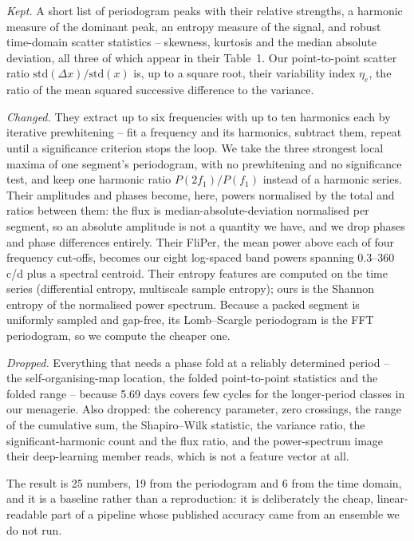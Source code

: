 \documentclass{article}
\begin{document}
\emph{Kept.} A short list of periodogram peaks with their relative strengths, a harmonic
measure of the dominant peak, an entropy measure of the signal, and robust time-domain scatter
statistics -- skewness, kurtosis and the median absolute deviation, all three of which appear in
their Table~1. Our point-to-point scatter ratio $\mathrm{std}(\Delta x)/\mathrm{std}(x)$ is, up to a
square root, their variability index $\eta_{e}$, the ratio of the mean squared successive difference
to the variance.

\emph{Changed.} They extract up to six frequencies with up to ten harmonics each by iterative
prewhitening -- fit a frequency and its harmonics, subtract them, repeat until a significance
criterion stops the loop. We take the three strongest local maxima of one segment's periodogram, with
no prewhitening and no significance test, and keep one harmonic ratio $P(2f_{1})/P(f_{1})$ instead of
a harmonic series. Their amplitudes and phases become, here, powers normalised by the total and
ratios between them: the flux is median-absolute-deviation normalised per segment, so an absolute
amplitude is not a quantity we have, and we drop phases and phase differences entirely. Their
FliPer, the mean power above each of four frequency cut-offs, becomes our eight log-spaced band
powers spanning 0.3--360\,c/d plus a spectral centroid. Their entropy features are computed on the
time series (differential entropy, multiscale sample entropy); ours is the Shannon entropy of the
normalised power spectrum. Because a packed segment is uniformly sampled and gap-free, its
Lomb--Scargle periodogram is the FFT periodogram, so we compute the cheaper one.

\emph{Dropped.} Everything that needs a phase fold at a reliably determined period -- the
self-organising-map location, the folded point-to-point statistics and the folded range -- because
5.69 days covers few cycles for the longer-period classes in our menagerie. Also dropped: the
coherency parameter, zero crossings, the range of the cumulative sum, the Shapiro--Wilk statistic,
the variance ratio, the significant-harmonic count and the flux ratio, and the power-spectrum image
their deep-learning member reads, which is not a feature vector at all.

The result is 25 numbers, 19 from the periodogram and 6 from the time domain, and it is a baseline
rather than a reproduction: it is deliberately the cheap, linear-readable part of a pipeline whose
published accuracy came from an ensemble we do not run.
\end{document}
